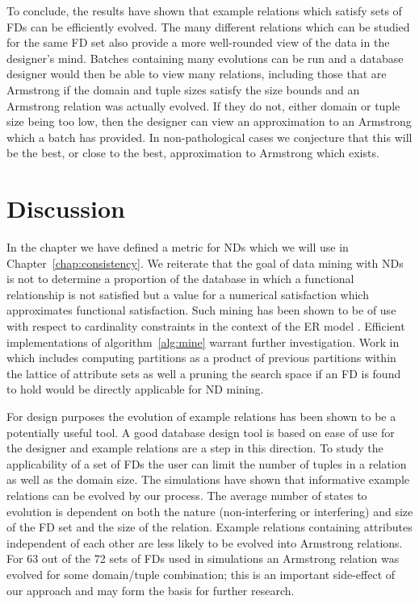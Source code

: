 \medskip
To conclude, the results have shown that example relations which satisfy sets
of FDs can be efficiently evolved. The many different
relations which can be studied for the same FD set also provide a
more well-rounded view of the data in the designer's mind.
Batches containing
many evolutions can be run and a database designer would then be able
to view many relations, including those that are Armstrong if the domain
and tuple sizes satisfy the size bounds and an Armstrong relation
was actually evolved.  If they do not, either domain
or tuple size being too low, then the designer can view an
approximation to an Armstrong which a batch has provided. In
non-pathological cases we conjecture that
this will be the best, or close to the best, approximation to Armstrong
which exists.

\section{Discussion}\label{sec:nd_disc}

In the chapter we have defined a metric for NDs which we will use in
Chapter~\ref{chap:consistency}. We reiterate that the goal of data
mining with NDs is not to determine a proportion of the database in
which a functional relationship is not satisfied but a value for a
numerical satisfaction which approximates functional
satisfaction. Such mining has been shown to be of use with respect to
cardinality constraints in the context of the ER model
\cite{sou98}. Efficient implementations of algorithm~\ref{alg:mine} 
warrant further investigation. Work in \cite{hkp98} which
includes computing partitions as a product of previous partitions within
the lattice of attribute sets as well a pruning the search space if an
FD is found to hold would be directly applicable for ND mining.

\medskip
{}
For design purposes the evolution of example relations has been shown to
be a potentially useful tool.  A good database
design tool is based on ease of use for the designer and example relations
are a step in this direction. To study the applicability of a set of FDs
 the user can limit the number of tuples in
a relation as well as the domain size. The simulations have shown that 
informative example relations can be evolved by our process.  The 
average number of states to evolution is dependent on both
the nature (non-interfering or interfering) and size of the FD set and the size of the relation.
Example relations containing attributes independent of each other
are less likely to be evolved into Armstrong relations. For 63 out
of the 72 sets of FDs used in simulations an Armstrong relation was evolved
for some domain/tuple combination; this is an important side-effect
of our approach and may form the basis for further research.

